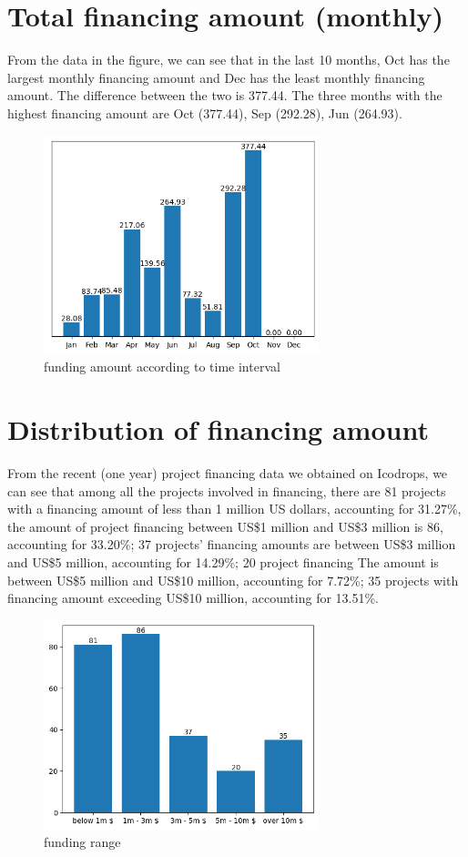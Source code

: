 \documentclass{TTP}
\begin{document}
\section{Total financing amount (monthly)}
From the data in the figure, we can see that in the last 10 months, Oct has the largest monthly financing amount and Dec has the least monthly financing amount. The difference between the two is 377.44. The three months with the highest financing amount are Oct (377.44), Sep (292.28), Jun (264.93).
\begin{figure}[h]
  \centering
  \includegraphics[width=8cm]{time_funding}
  \caption{funding amount according to time interval}
\end{figure}

\section{Distribution of financing amount}
From the recent (one year) project financing data we obtained on Icodrops, we can see that among all the projects involved in financing, there are 81 projects with a financing amount of less than 1 million US dollars, accounting for 31.27\%, the amount of project financing between US\$1 million and US\$3 million is 86, accounting for 33.20\%; 37 projects' financing amounts are between US\$3 million and US\$5 million, accounting for 14.29\%; 20 project financing The amount is between US\$5 million and US\$10 million, accounting for 7.72\%; 35 projects with financing amount exceeding US\$10 million, accounting for 13.51\%.
\begin{figure}[h]
  \centering
  \includegraphics[width=8cm]{funding_range}
  \caption{funding range}
\end{figure}
\end{document}
